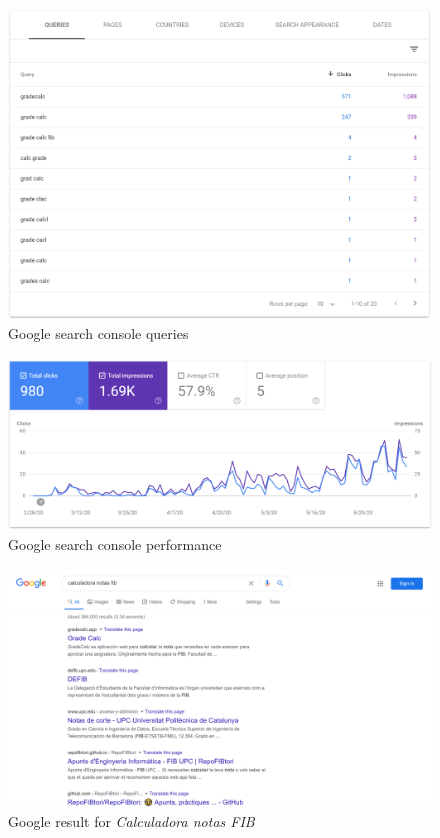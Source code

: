 \vfill
\begin{figure}[h!]
    \center
    \includegraphics[width=1\columnwidth]{media/search-conole-queries.png}
    \caption{Google search console queries}
    \label{fig:search-console-queries}
\end{figure}
\vfill

\clearpage\newpage\null

\vfill
\begin{figure}[h!]
    \center
    \includegraphics[width=1\columnwidth]{media/search-console-plot.png}
    \caption{Google search console performance}
    \label{fig:search-console-plot}
\end{figure}
\vfill
\begin{figure}[h!]
    \center
    \includegraphics[frame,width=1\columnwidth]{media/screenshot-first-google-result.png}
    \caption{Google result for \textit{Calculadora notas FIB}}
    \label{fig:first-result}
\end{figure}
\vfill

